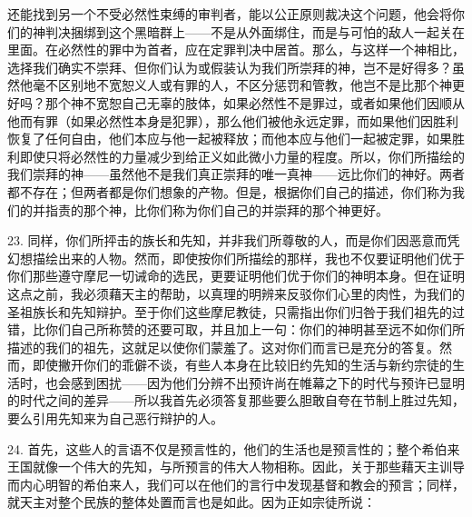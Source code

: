 还能找到另一个不受必然性束缚的审判者，能以公正原则裁决这个问题，他会将你们的神判决捆绑到这个黑暗群上——不是从外面绑住，而是与可怕的敌人一起关在里面。在必然性的罪中为首者，应在定罪判决中居首。那么，与这样一个神相比，选择我们确实不崇拜、但你们认为或假装认为我们所崇拜的神，岂不是好得多？虽然他毫不区别地不宽恕义人或有罪的人，不区分惩罚和管教，他岂不是比那个神更好吗？那个神不宽恕自己无辜的肢体，如果必然性不是罪过，或者如果他们因顺从他而有罪（如果必然性本身是犯罪），那么他们被他永远定罪，而如果他们因胜利恢复了任何自由，他们本应与他一起被释放；而他本应与他们一起被定罪，如果胜利即使只将必然性的力量减少到给正义如此微小力量的程度。所以，你们所描绘的我们崇拜的神——虽然他不是我们真正崇拜的唯一真神——远比你们的神好。两者都不存在；但两者都是你们想象的产物。但是，根据你们自己的描述，你们称为我们的并指责的那个神，比你们称为你们自己的并崇拜的那个神更好。\par

23. 同样，你们所抨击的族长和先知，并非我们所尊敬的人，而是你们因恶意而凭幻想描绘出来的人物。然而，即使按你们所描绘的那样，我也不仅要证明他们优于你们那些遵守摩尼一切诫命的选民，更要证明他们优于你们的神明本身。但在证明这点之前，我必须藉天主的帮助，以真理的明辨来反驳你们心里的肉性，为我们的圣祖族长和先知辩护。至于你们这些摩尼教徒，只需指出你们归咎于我们祖先的过错，比你们自己所称赞的还要可取，并且加上一句：你们的神明甚至远不如你们所描述的我们的祖先，这就足以使你们蒙羞了。这对你们而言已是充分的答复。然而，即使撇开你们的乖僻不谈，有些人本身在比较旧约先知的生活与新约宗徒的生活时，也会感到困扰——因为他们分辨不出预许尚在帷幕之下的时代与预许已显明的时代之间的差异——所以我首先必须答复那些要么胆敢自夸在节制上胜过先知，要么引用先知来为自己恶行辩护的人。\par

24. 首先，这些人的言语不仅是预言性的，他们的生活也是预言性的；整个希伯来王国就像一个伟大的先知，与所预言的伟大人物相称。因此，关于那些藉天主训导而内心明智的希伯来人，我们可以在他们的言行中发现基督和教会的预言；同样，就天主对整个民族的整体处置而言也是如此。因为正如宗徒所说：\par


